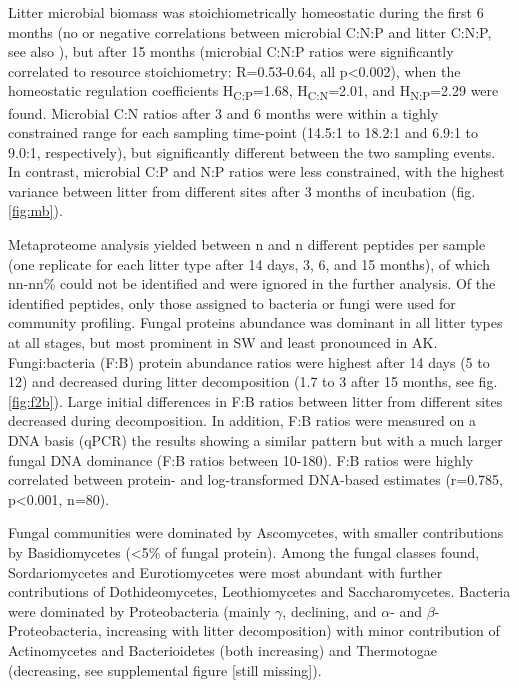 Litter microbial biomass was stoichiometrically homeostatic during the first 6 months (no or negative correlations between microbial C:N:P and litter C:N:P, see also \cite{Mooshammer2011}), but after 15 months (microbial C:N:P ratios were significantly correlated to resource stoichiometry: R=0.53-0.64, all p\textless 0.002), when the homeostatic regulation coefficients \cite{Sterner2002} H\textsubscript{C:P}=1.68, H\textsubscript{C:N}=2.01, and H\textsubscript{N:P}=2.29 were found. Microbial C:N ratios after 3 and 6 months were within a tighly constrained range for each sampling time-point (14.5:1 to 18.2:1 and 6.9:1 to 9.0:1, respectively), but significantly different between the two sampling events. In contrast, microbial C:P and N:P ratios were less constrained, with the highest variance between litter from different sites after 3 months of incubation (fig. \ref{fig:mb}).

Metaproteome analysis  yielded between n and n different peptides per sample (one replicate for each litter type after 14 days, 3, 6, and 15 months), of which nn-nn\% could not be identified and were ignored in the further analysis. Of the identified peptides, only those assigned to bacteria or fungi were used for community profiling. Fungal proteins abundance was dominant in all litter types at all stages, but most prominent in SW and least pronounced in  AK. Fungi:bacteria (F:B) protein abundance ratios were highest after 14 days (5 to 12) and decreased during litter decomposition (1.7 to 3 after 15 months, see fig. \ref{fig:f2b}). Large initial differences in F:B ratios between litter from different sites decreased during decomposition. In addition, F:B ratios were measured on a DNA basis (qPCR) the results showing a similar pattern but with a much larger fungal DNA dominance (F:B ratios between 10-180). F:B ratios were highly correlated between protein- and log-transformed DNA-based estimates (r=0.785, p\textless 0.001, n=80).

Fungal communities were dominated by Ascomycetes, with smaller contributions by Basidiomycetes (<5\% of fungal protein).  Among the fungal classes found, Sordariomycetes and Eurotiomycetes were most abundant with further contributions of Dothideomycetes, Leothiomycetes and Saccharomycetes. Bacteria were dominated by Proteobacteria (mainly $\gamma$, declining, and $\alpha$- and $\beta$-Proteobacteria, increasing with litter decomposition) with minor contribution of Actinomycetes and Bacterioidetes (both increasing) and Thermotogae (decreasing, see supplemental figure [still missing]).

